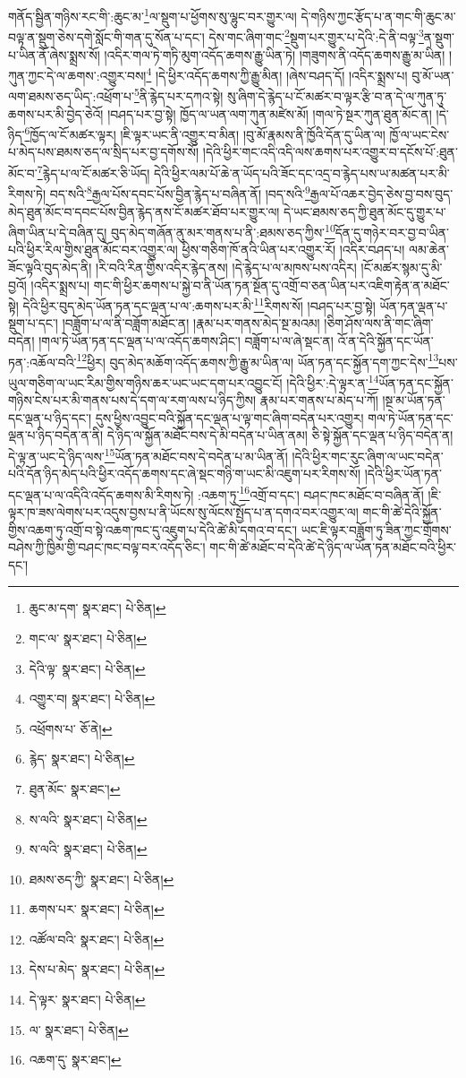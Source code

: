 གནོད་སྦྱིན་གཉིས་རང་གི་:ཆུང་མ་\footnote{ཆུང་མ་དག་  སྣར་ཐང་།  པེ་ཅིན། }ལ་སྡུག་པ་ཕྱོགས་སུ་ལྷུང་བར་གྱུར་ལ། དེ་གཉིས་ཀྱང་རྩོད་པ་ན་གང་གི་ཆུང་མ་བལྟ་ན་སྡུག་ཅེས་དགེ་སློང་གི་གན་དུ་སོན་པ་དང་། དེས་གང་ཞིག་གང་\footnote{གང་ལ་  སྣར་ཐང་།  པེ་ཅིན། }སྡུག་པར་གྱུར་པ་དེའི་:དེ་ནི་བལྟ་\footnote{དེའི་ལྟ་  སྣར་ཐང་།  པེ་ཅིན། }ན་སྡུག་པ་ཡིན་ནོ་ཞེས་སྨྲས་སོ། །འདིར་གལ་ཏེ་གཏི་མུག་འདོད་ཆགས་རྒྱུ་ཡིན་ཏེ། །གཟུགས་ནི་འདོད་ཆགས་རྒྱུ་མ་ཡིན། །ཀུན་ཀྱང་དེ་ལ་ཆགས་:འགྱུར་བས།\footnote{འགྱུར་བ།  སྣར་ཐང་།  པེ་ཅིན། } །དེ་ཕྱིར་འདོད་ཆགས་ཀྱི་རྒྱུ་མིན། །ཞེས་བཤད་དོ། །འདིར་སྨྲས་པ། བུ་མོ་ཡན་ལག་ཐམས་ཅད་ཡིད་:འཕྲོག་པ་\footnote{འཕྲོགས་པ་  ཅོ་ནེ། }ནི་རྙེད་པར་དཀའ་སྟེ། སུ་ཞིག་དེ་རྙེད་པ་ངོ་མཚར་བ་ལྟར་རྩི་བ་ན་དེ་ལ་ཀུན་ཏུ་ཆགས་པར་མི་བྱེད་ཅེའོ། །བཤད་པར་བྱ་སྟེ། ཁྱོད་ལ་ཡན་ལག་ཀུན་མཛེས་མོ། །གལ་ཏེ་སྔར་ཀུན་ཐུན་མོང་ན། །དེ་ཉིད་\footnote{རྙེད་  སྣར་ཐང་།  པེ་ཅིན། }ཁྱོད་ལ་ངོ་མཚར་ལྟར། །ཇི་ལྟར་ཡང་ནི་འགྱུར་བ་མིན། །བུ་མོ་རྣམས་ནི་ཁྱོའི་དོན་དུ་ཡིན་ལ། ཁྱོ་ལ་ཡང་ངེས་པ་མེད་པས་ཐམས་ཅད་ལ་སྲིད་པར་བྱ་དགོས་སོ། །དེའི་ཕྱིར་གང་འདི་འདི་ལས་ཆགས་པར་འགྱུར་བ་དངོས་པོ་:ཐུན་མོང་བ་\footnote{ཐུན་མོང་  སྣར་ཐང་། }རྙེད་པ་ལ་ངོ་མཚར་ཅི་ཡོད། དེའི་ཕྱིར་ལམ་པོ་ཆེ་ན་ཡོད་པའི་ཟོང་དང་འདྲ་བ་རྙེད་པས་ཡ་མཚན་པར་མི་རིགས་ཏེ། བད་སའི་\footnote{ས་ལའི་  སྣར་ཐང་།  པེ་ཅིན། }རྒྱལ་པོས་དབང་པོས་བྱིན་རྙེད་པ་བཞིན་ནོ། །བད་སའི་\footnote{ས་ལའི་  སྣར་ཐང་།  པེ་ཅིན། }རྒྱལ་པོ་འཆར་བྱེད་ཅེས་བྱ་བས་བུད་མེད་ཐུན་མོང་བ་དབང་པོས་བྱིན་རྙེད་ནས་ངོ་མཚར་ཐོབ་པར་གྱུར་ལ། དེ་ཡང་ཐམས་ཅད་ཀྱི་ཐུན་མོང་དུ་གྱུར་པ་ཞིག་ཡིན་པ་དེ་བཞིན་དུ། བུད་མེད་གཞོན་ནུ་མར་གནས་པ་ནི་:ཐམས་ཅད་ཀྱིས་\footnote{ཐམས་ཅད་ཀྱི་  སྣར་ཐང་།  པེ་ཅིན། }དོན་དུ་གཉེར་བར་བྱ་བ་ཡིན་པའི་ཕྱིར་རིལ་གྱིས་ཐུན་མོང་བར་འགྱུར་ལ། ཕྱིས་གཅིག་ཁོ་ནའི་ཡིན་པར་འགྱུར་རོ། །འདིར་བཤད་པ། ལམ་ཆེན་ཟོང་ལྟའི་བུད་མེད་ནི། །རི་བའི་རིན་གྱིས་འདིར་རྙེད་ནས། །དེ་རྙེད་པ་ལ་མཁས་པས་འདིར། །ངོ་མཚར་སྙམ་དུ་མི་བྱའོ། །འདིར་སྨྲས་པ། གང་གི་ཕྱིར་ཆགས་པ་སྐྱེ་བ་ནི་ཡོན་ཏན་སྔོན་དུ་འགྲོ་བ་ཅན་ཡིན་པར་འཇིག་རྟེན་ན་མཐོང་སྟེ། དེའི་ཕྱིར་བུད་མེད་ཡོན་ཏན་དང་ལྡན་པ་ལ་:ཆགས་པར་མི་\footnote{ཆགས་པར་  སྣར་ཐང་།  པེ་ཅིན། }རིགས་སོ། །བཤད་པར་བྱ་སྟེ། ཡོན་ཏན་ལྡན་པ་སྡུག་པ་དང་། །བཟློག་པ་ལ་ནི་བཟློག་མཐོང་ན། །རྣམ་པར་གནས་མེད་སྔ་མའམ། །ཅིག་ཤོས་ལས་ནི་གང་ཞིག་བདེན། །གལ་ཏེ་ཡོན་ཏན་དང་ལྡན་པ་ལ་འདོད་ཆགས་ཤིང་། བཟློག་པ་ལ་ཞེ་སྡང་ན། འོ་ན་དེའི་སྐྱོན་དང་ཡོན་ཏན་:འཆོལ་བའི་\footnote{འཚོལ་བའི་  སྣར་ཐང་།  པེ་ཅིན། }ཕྱིར། བུད་མེད་མཆོག་འདོད་ཆགས་ཀྱི་རྒྱུ་མ་ཡིན་ལ། ཡོན་ཏན་དང་སྐྱོན་དག་ཀྱང་དེས་\footnote{དེས་པ་མེད་  སྣར་ཐང་།  པེ་ཅིན། }པས་ཡུལ་གཅིག་ལ་ཡང་རིམ་གྱིས་གཉིས་ཆར་ཡང་ཡང་དག་པར་འབྱུང་ངོ། །དེའི་ཕྱིར་:དེ་ལྟར་ན་\footnote{དེ་ལྟར་  སྣར་ཐང་།  པེ་ཅིན། }ཡོན་ཏན་དང་སྐྱོན་གཉིས་ངེས་པར་མི་གནས་པས་དེ་དག་ལ་རག་ལས་པ་ཉིད་ཀྱིས། རྣམ་པར་གནས་པ་མེད་པ་ཀོ། །སྔ་མ་ཡོན་ཏན་དང་ལྡན་པ་ཉིད་དང་། དུས་ཕྱིས་འབྱུང་བའི་སྐྱོན་དང་ལྡན་པ་ལྟ་གང་ཞིག་བདེན་པར་འགྱུར། གལ་ཏེ་ཡོན་ཏན་དང་ལྡན་པ་ཉིད་བདེན་ན་ནི། དེ་ཉིད་ལ་སྐྱོན་མཐོང་བས་དེ་མི་བདེན་པ་ཡིན་ནམ། ཅི་སྟེ་སྐྱོན་དང་ལྡན་པ་ཉིད་བདེན་ན། དེ་ལྟ་ན་ཡང་དེ་ཉིད་ལས་\footnote{ལ་  སྣར་ཐང་།  པེ་ཅིན། }ཡོན་ཏན་མཐོང་བས་དེ་བདེན་པ་མ་ཡིན་ནོ། །དེའི་ཕྱིར་གང་རུང་ཞིག་ལ་ཡང་བདེན་པའི་དོན་ཉིད་མེད་པའི་ཕྱིར་འདོད་ཆགས་དང་ཞེ་སྡང་གཉི་ག་ཡང་མི་འཇུག་པར་རིགས་སོ། །དེའི་ཕྱིར་ཡོན་ཏན་དང་ལྡན་པ་ལ་འདིའི་འདོད་ཆགས་མི་རིགས་ཏེ། :འཆག་ཏུ་\footnote{འཆག་དུ་  སྣར་ཐང་། }འགྲོ་བ་དང་། བཤང་ཁང་མཐོང་བ་བཞིན་ནོ། །ཇི་ལྟར་ཁ་ཟས་ལེགས་པར་འདུས་བྱས་པ་ནི་ཡོངས་སུ་ལོངས་སྤྱོད་པ་ན་དགའ་བར་འགྱུར་ལ། གང་གི་ཚེ་དེའི་སྐྱོན་གྱིས་འཆག་ཏུ་འགྲོ་བ་སྟེ་འཆག་ཁང་དུ་འཇུག་པ་དེའི་ཚེ་མི་དགའ་བ་དང་། ཡང་ཇི་ལྟར་བཟློག་ཏུ་ཟིན་ཀྱང་གྲོགས་བཤེས་ཀྱི་ཁྱིམ་གྱི་བཤང་ཁང་བལྟ་བར་འདོད་ཅིང་། གང་གི་ཚེ་མཐོང་བ་དེའི་ཚེ་དེ་ཉིད་ལ་ཡོན་ཏན་མཐོང་བའི་ཕྱིར་དང་། 